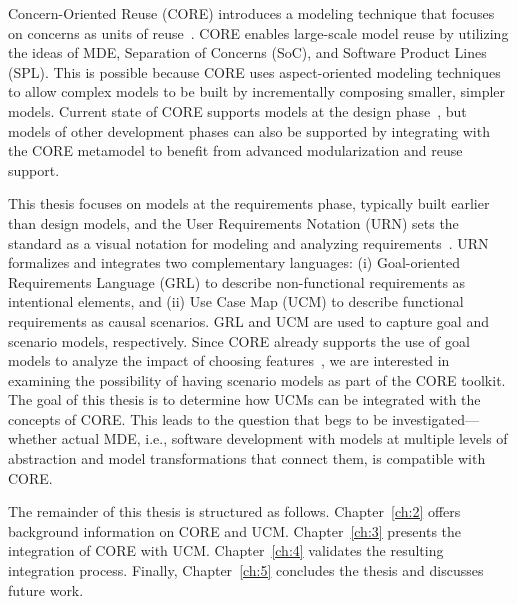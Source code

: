 Concern-Oriented Reuse (CORE) introduces a modeling technique that focuses on concerns as units of reuse~\cite{alam2013concern}. CORE enables large-scale model reuse by utilizing the ideas of MDE, Separation of Concerns (SoC), and Software Product Lines (SPL). This is possible because CORE uses aspect-oriented modeling techniques to allow complex models to be built by incrementally composing smaller, simpler models. Current state of CORE supports models at the design phase~\cite{kienzle2010aspect}, but models of other development phases can also be supported by integrating with the CORE metamodel to benefit from advanced modularization and reuse support.

This thesis focuses on models at the requirements phase, typically built earlier than design models, and the User Requirements Notation (URN) sets the standard as a visual notation for modeling and analyzing requirements~\cite{amyot2002urn}. URN formalizes and integrates two complementary languages: (i) Goal-oriented Requirements Language (GRL) to describe non-functional requirements as intentional elements, and (ii) Use Case Map (UCM) to describe functional requirements as causal scenarios. GRL and UCM are used to capture goal and scenario models, respectively. Since CORE already supports the use of goal models to analyze the impact of choosing features~\cite{alam2013concern}, we are interested in examining the possibility of having scenario models as part of the CORE toolkit. The goal of this thesis is to determine how UCMs can be integrated with the concepts of CORE. This leads to the question that begs to be investigated---whether actual MDE, i.e., software development with models at multiple levels of abstraction and model transformations that connect them, is compatible with CORE.

The remainder of this thesis is structured as follows. Chapter~\ref{ch:2} offers background information on CORE and UCM. Chapter~\ref{ch:3} presents the integration of CORE with UCM. Chapter~\ref{ch:4} validates the resulting integration process. Finally, Chapter~\ref{ch:5} concludes the thesis and discusses future work.
